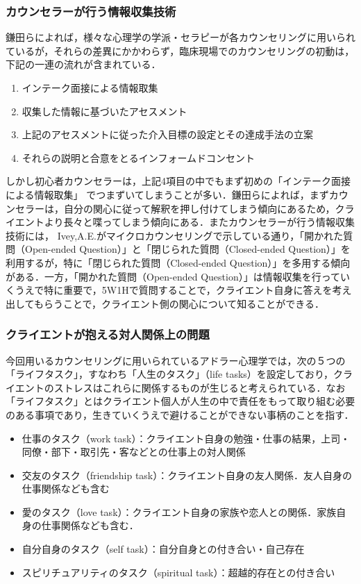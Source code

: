 \documentclass[shuuron]{kuee}
\begin{document}
\subsubsection{カウンセラーが行う情報収集技術}

鎌田ら\cite{Darshana}によれば，様々な心理学の学派・セラピーが各カウンセリングに用いられているが，それらの差異にかかわらず，臨床現場でのカウンセリングの初動は，下記の一連の流れが含まれている．

\begin{enumerate}
  \item インテーク面接による情報取集
  \item 収集した情報に基づいたアセスメント
  \item 上記のアセスメントに従った介入目標の設定とその達成手法の立案
  \item それらの説明と合意をとるインフォームドコンセント
\end{enumerate}
しかし初心者カウンセラーは，上記4項目の中でもまず初めの「インテーク面接による情報取集」
でつまずいてしまうことが多い．鎌田らによれば，まずカウンセラーは，自分の関心に従って解釈を押し付けてしまう傾向にあるため，クライエントより長々と喋ってしまう傾向にある．またカウンセラーが行う情報収集技術には，
Ivey,A.E.\cite{ivey}がマイクロカウンセリングで示している通り，「開かれた質問（Open-ended Question）」と「閉じられた質問（Closed-ended Question）」を利用するが，特に「閉じられた質問（Closed-ended Question）」を多用する傾向がある．一方，「開かれた質問（Open-ended Question）」は情報収集を行っていくうえで特に重要で，5W1Hで質問することで，クライエント自身に答えを考え出してもらうことで，クライエント側の関心について知ることができる．

\subsubsection{クライエントが抱える対人関係上の問題}


今回用いるカウンセリングに用いられているアドラー心理学では，次の５つの「ライフタスク」，すなわち「人生のタスク」（life tasks）を設定しており，クライエントのストレスはこれらに関係するものが生じると考えられている．なお「ライフタスク」とはクライエント個人が人生の中で責任をもって取り組む必要のある事項であり，生きていくうえで避けることができない事柄のことを指す．
\begin{itemize}
  \item 仕事のタスク（work task）：クライエント自身の勉強・仕事の結果，上司・同僚・部下・取引先・客などとの仕事上の対人関係
  \item 交友のタスク（friendship task）：クライエント自身の友人関係．友人自身の仕事関係なども含む
  \item 愛のタスク（love task）：クライエント自身の家族や恋人との関係．家族自身の仕事関係なども含む．
  \item 自分自身のタスク（self task）：自分自身との付き合い・自己存在
  \item スピリチュアリティのタスク（spiritual task）：超越的存在との付き合い\cite{大友秀治2013全人的人間理解を促進するスピリチュアリティ概念に関する一考察}
\end{itemize}
\end{document}
